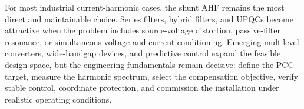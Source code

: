 \documentclass[conference]{IEEEtran}
\begin{document}
For most industrial current-harmonic cases, the shunt AHF remains the most direct and maintainable choice. Series filters, hybrid filters, and UPQCs become attractive when the problem includes source-voltage distortion, passive-filter resonance, or simultaneous voltage and current conditioning. Emerging multilevel converters, wide-bandgap devices, and predictive control expand the feasible design space, but the engineering fundamentals remain decisive: define the PCC target, measure the harmonic spectrum, select the compensation objective, verify stable control, coordinate protection, and commission the installation under realistic operating conditions.



\end{document}
